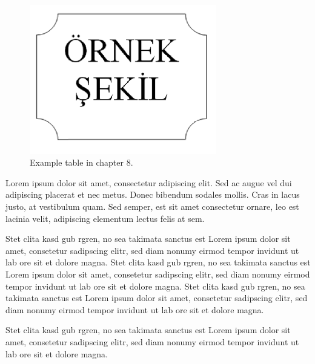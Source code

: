 \begin{figure}
	\centering
	\includegraphics[width=230pt,keepaspectratio=true]{./fig/sekil7}
	\caption{Example table in chapter 8.}
	\label{Figure8.1}
\end{figure}

Lorem ipsum dolor sit amet, consectetur adipiscing elit. Sed ac augue vel dui adipiscing placerat et nec metus. Donec bibendum sodales mollis. Cras in lacus justo, at vestibulum quam. Sed semper, est sit amet consectetur ornare, leo est lacinia velit, adipiscing elementum lectus felis at sem.

Stet clita kasd gub rgren, no sea takimata sanctus est Lorem ipsum dolor sit amet, consetetur sadipscing elitr, sed diam nonumy eirmod tempor invidunt ut lab ore sit et dolore magna. Stet clita kasd gub rgren, no sea takimata sanctus est Lorem ipsum dolor sit amet, consetetur sadipscing elitr, sed diam nonumy eirmod tempor invidunt ut lab ore sit et dolore magna. Stet clita kasd gub rgren, no sea takimata sanctus est Lorem ipsum dolor sit amet, consetetur sadipscing elitr, sed diam nonumy eirmod tempor invidunt ut lab ore sit et dolore magna. 

Stet clita kasd gub rgren, no sea takimata sanctus est Lorem ipsum dolor sit amet, consetetur sadipscing elitr, sed diam nonumy eirmod tempor invidunt ut lab ore sit et dolore magna. 



